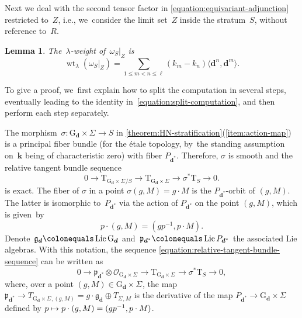 \documentclass[JEP,XML,SOM,Unicode,NoEqCountersInSection,published]{cedram}
\newcommand\mto{\mathchoice{\longmapsto}{\mapsto}{\mapsto}{\mapsto}}
\theoremstyle{plain}
\newtheorem{lemma}[theorem]{Lemma}
\theoremstyle{definition}
\DeclareMathOperator\weight{wt}
\newcommand\blade[1][]{\Sigma_{#1}}
\newcommand\field{\mathbf{k}}
\newcommand\group[1][\tuple{d}]{\mathrm{G}_{#1}}
\newcommand\tangent{\ensuremath{\mathrm{T}}}
\newcommand\tuple[1]{\ensuremath{{\boldsymbol{#1}}}}
\begin{document}
Next we deal with the second tensor factor in \eqref{equation:equivariant-adjunction}
restricted to~$Z$,
i.e., we~consider the limit set~$Z$ inside the stratum~$S$,
without reference to~$R$.
\begin{lemma}
\label{lemma:omega-SZ-weight}
The~$\lambda$-weight of~$\omega_S|_Z$ is
\begin{equation}
\weight_{\lambda}(\omega_S|_Z) = \sum_{1\leq m<n\leq\ell}(k_m-k_n)\langle \tuple{d}^n,\tuple{d}^m\rangle.
\end{equation}
\end{lemma}
To give a proof, we~first explain how to split the computation in several steps,
eventually leading to the identity in~\eqref{equation:split-computation},
and then perform each step separately.

The morphism~$\sigma\colon \group \times \blade \to S$
in \cref{theorem:HN-stratification}(\ref{item:action-map})
is a principal fiber bundle (for the étale topology, by~the standing assumption on~$\field$ being of characteristic zero)
with fiber $P_{\tuple{d}^*}$.
Therefore, $\sigma$ is smooth and the relative tangent bundle sequence
\begin{equation}
\label{equation:relative-tangent-bundle-sequence}
0
\to\tangent_{\group \times \blade/S}
\to\tangent_{\group \times \blade}
\to\sigma^*\tangent_{S}
\to0.
\end{equation}
is exact.
The fiber of $\sigma$ in a point $\sigma(g,M) = g\cdot M$ is the $P_{\tuple{d}^*}$-orbit of $(g,M)$.
The latter is isomorphic to~$P_{\tuple{d}^*}$ via the action of $P_{\tuple{d}^*}$ on the point $(g,M)$, which is given~by
\begin{equation*}
p \cdot (g,M) = (gp^{-1}, p\cdot M).
\end{equation*}
Denote~$\mathfrak{g}_{\tuple{d}}\colonequals\operatorname{Lie}\group$
and~$\mathfrak{p}_{\tuple{d}^*}\colonequals\operatorname{Lie}P_{\tuple{d}^*}$
the associated Lie algebras.
With this notation,
the sequence \eqref{equation:relative-tangent-bundle-sequence} can be written as
\begin{equation}
\label{equation:relative-tangent-bundle-sequence-rewritten}
0
\to\mathfrak{p}_{\tuple{d}^*} \otimes \mathcal{O}_{\group \times \blade}
\to\tangent_{\group \times \blade}
\to\sigma^*\tangent_{S}
\to0,
\end{equation}
where, over a point $(g,M) \in \group \times \blade$,
the map $\mathfrak{p}_{\tuple{d}^*} \to T_{\group \times \blade,(g,M)} = g\cdot \mathfrak{g}_{\tuple{d}} \oplus T_{\blade,M}$
is the derivative of the map $P_{\tuple{d}^*} \to \group \times \blade$
defined by $p \mto p\cdot (g,M) = (gp^{-1}, p\cdot M)$.
\end{document}
